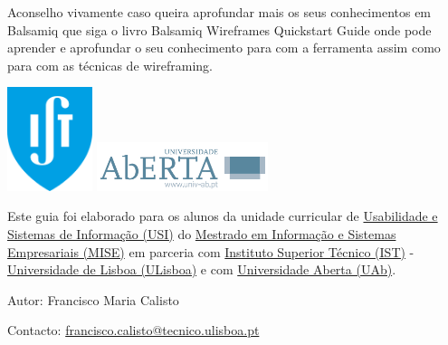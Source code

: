 \documentclass{tufte-book} %
\begin{document}
Aconselho vivamente caso queira aprofundar mais os seus conhecimentos em Balsamiq que siga o livro Balsamiq Wireframes Quickstart Guide \cite{faranello2012balsamiq} onde pode aprender e aprofundar o seu conhecimento para com a ferramenta assim como para com as técnicas de wireframing.

\vspace{2.5cm}

\begin{center}
	\includegraphics[width=2.5cm]{../assets/ist_logo.png}
	\hfill
	\includegraphics[width=5cm]{../assets/uab_logo.png}
\end{center}

Este guia foi elaborado para os alunos da unidade curricular de \href{https://fenix.tecnico.ulisboa.pt/cursos/mise/disciplina-curricular/1529008521544}{Usabilidade e Sistemas de Informação (USI)} do \href{https://fenix.tecnico.ulisboa.pt/cursos/mise}{Mestrado em Informação e Sistemas Empresariais (MISE)} em parceria com \href{https://tecnico.ulisboa.pt/}{Instituto Superior Técnico (IST)} - \href{http://www.ulisboa.pt/}{Universidade de Lisboa (ULisboa)} e com \href{http://www.uab.pt/}{Universidade Aberta (UAb)}.

\vspace{2.5cm}

Autor: Francisco Maria Calisto

Contacto: \href{francisco.calisto@tecnico.ulisboa.pt}{francisco.calisto@tecnico.ulisboa.pt}




\printindex
\end{document}
